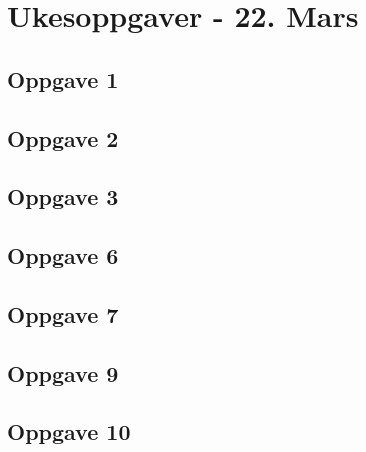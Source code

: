\documentclass[a4paper, norsk, 12pt]{article}
\begin{document}
\section{Ukesoppgaver - 22. Mars}
\subsection{Oppgave 1}
\subsection{Oppgave 2}
\subsection{Oppgave 3}
\subsection{Oppgave 6}
\subsection{Oppgave 7}
\subsection{Oppgave 9}
\subsection{Oppgave 10}


%

\end{document}
